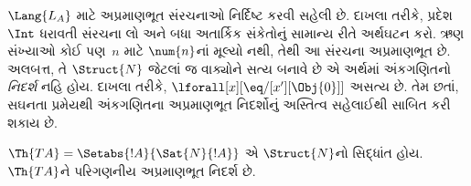 \begin{explain}
$\Lang{L_A}$ માટે અપ્રમાણભૂત સંરચનાઓ નિર્દિષ્ટ કરવી સહેલી છે.
દાખલા તરીકે, પ્રદેશ~$\Int$ ધરાવતી સંરચના લો અને બધા અતાર્કિક
સંકેતોનું સામાન્ય રીતે અર્થઘટન કરો. ઋણ સંખ્યાઓ કોઈ પણ~$n$ માટે
$\num{n}$નાં મૂલ્યો નથી, તેથી આ સંરચના અપ્રમાણભૂત છે. અલબત્ત, તે
$\Struct{N}$ જેટલાં જ વાક્યોને સત્ય બનાવે છે એ અર્થમાં અંકગણિતનો
\emph{નિદર્શ} નહિ હોય. દાખલા તરીકે,
$\lforall[x][\eq/[x'][\Obj{0}]]$ અસત્ય છે. તેમ છતાં, સઘનતા પ્રમેયથી
અંકગણિતના અપ્રમાણભૂત નિદર્શોનું અસ્તિત્વ સહેલાઈથી સાબિત કરી શકાય છે.
\end{explain}

\begin{prop}
$\Th{TA}=\Setabs{!A}{\Sat{N}{!A}}$ એ $\Struct{N}$નો સિદ્ધાંત હોય.
$\Th{TA}$ને પરિગણનીય અપ્રમાણભૂત નિદર્શ છે.
\end{prop}

